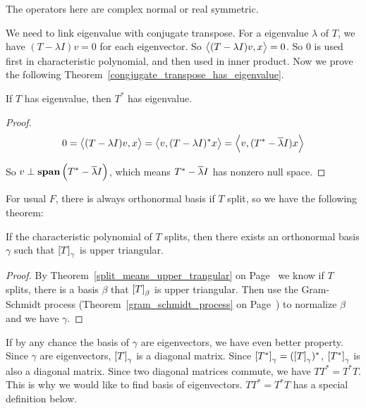 The operators here are complex normal or real symmetric.

We need to link eigenvalue with conjugate transpose. For a eigenvalue $\lambda$ of $T$, we have $(T - \lambda I)v = 0$ for each eigenvector. So $\left\langle \displaystyle (T-\lambda I)v, x \right\rangle = 0$. So $0$ is used first in characteristic polynomial, and then used in inner product. Now we prove the following Theorem~\ref{congjugate_transpose_has_eigenvalue}.

\begin{theorem}\label{congjugate_transpose_has_eigenvalue}
    If $T$ has eigenvalue, then $T^*$ has eigenvalue.    
\end{theorem}
\begin{proof}
    \begin{equation*}
        0 = \left\langle \displaystyle (T-\lambda I)v, x \right\rangle = \left\langle \displaystyle v, (T-\lambda I)^* x \right\rangle = \left\langle \displaystyle v, (T^* - \overline{\lambda}I) x \right\rangle
    \end{equation*}
    
    So $v \perp \displaystyle \mathbf{span}\left( T^* - \overline{\lambda}I \right)$, which means $T^* - \overline{\lambda}I$ has nonzero null space.
\end{proof}


For usual $F$, there is always orthonormal basis if $T$ split, so we have the following theorem:
\begin{theorem}[Schur]\label{schur_theorem}
    If the characteristic polynomial of $T$ splits, then there exists an orthonormal basis $\gamma$ such that $\coordinate{T}_\gamma$ is upper triangular.
\end{theorem}
\begin{proof}
    By Theorem~\ref{split_means_upper_trangular} on Page~\pageref{split_means_upper_trangular} we know if $T$ splits, there is a basis $\beta$ that $\coordinate{T}_\beta$ is upper triangular. Then use the Gram-Schmidt process (Theorem~\ref{gram_schmidt_process} on Page~\pageref{gram_schmidt_process}) to normalize $\beta$ and we have $\gamma$.
\end{proof}

If by any chance the basis of $\gamma$ are eigenvectors, we have even better property. Since $\gamma$ are eigenvectors, $\coordinate{T}_\gamma$ is a diagonal matrix. Since $\coordinate{T^*}_\gamma = (\coordinate{T}_\gamma)^*$, $\coordinate{T^*}_\gamma$ is also a diagonal matrix. Since two diagonal matrices commute, we have $TT^* = T^* T$. This is why we would like to find basis of eigenvectors. $TT^* = T^* T$ has a special definition below.

